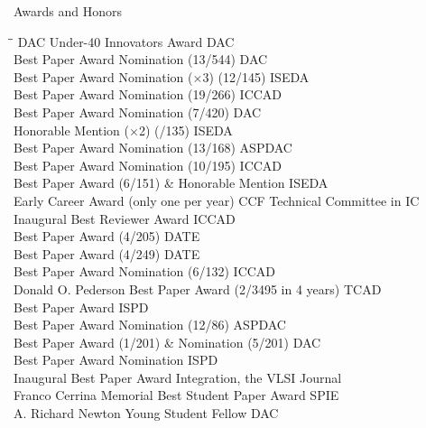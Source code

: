 
\begin{rSection}{Awards and Honors}
\begin{tabbing}
\hspace{3.8in}\= \hspace{2.6in}\= \kill
DAC Under-40 Innovators Award \> DAC  \\
Best Paper Award Nomination (13/544) \> DAC  \\
Best Paper Award Nomination ($\times$3) (12/145) \> ISEDA  \\
Best Paper Award Nomination (19/266) \> ICCAD  \\
Best Paper Award Nomination (7/420) \> DAC  \\
Honorable Mention ($\times$2) (/135) \> ISEDA  \\
Best Paper Award Nomination (13/168) \> ASPDAC  \\
Best Paper Award Nomination (10/195) \> ICCAD  \\
Best Paper Award (6/151) \& Honorable Mention \> ISEDA  \\
Early Career Award (only one per year) \> CCF Technical Committee in IC  \\
Inaugural Best Reviewer Award \> ICCAD  \\
Best Paper Award (4/205) \> DATE  \\
Best Paper Award (4/249) \> DATE  \\
Best Paper Award Nomination (6/132) \> ICCAD  \\
Donald O. Pederson Best Paper Award (2/3495 in 4 years) \> TCAD  \\
Best Paper Award \> ISPD  \\
Best Paper Award Nomination (12/86) \> ASPDAC  \\
Best Paper Award (1/201) \& Nomination (5/201) \> DAC  \\
Best Paper Award Nomination \> ISPD  \\
Inaugural Best Paper Award \> Integration, the VLSI Journal  \\
Franco Cerrina Memorial Best Student Paper Award \> SPIE  \\
A. Richard Newton Young Student Fellow \> DAC  \\
\end{tabbing}
\end{rSection}

